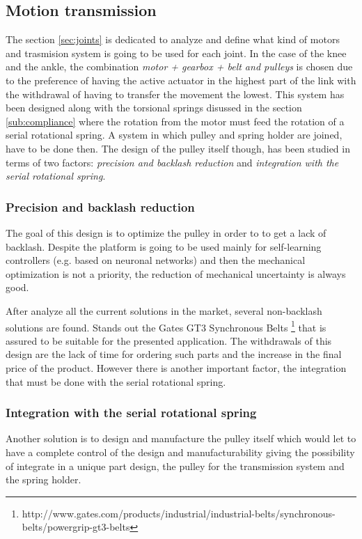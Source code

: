 \subsection{Motion transmission} %
\label{sub:pulleys_and_belts}
The section \ref{sec:joints} is dedicated to analyze and define what kind of motors and trasmision system is going to be used for each joint.
In the case of the knee and the ankle, the combination \textit{motor + gearbox + belt and pulleys} is chosen due to the preference of having the active actuator in the highest part of the link with the withdrawal of having to transfer the movement the lowest.
This system has been designed along with the torsional springs disussed in the section \ref{sub:compliance} where the rotation from the motor must feed the rotation of a serial rotational spring.
A system in which pulley and spring holder are joined, have to be done then.
The design of the pulley itself though, has been studied in terms of two factors: \textit{precision and backlash reduction} and \textit{integration with the serial rotational spring}.

\subsubsection{Precision and backlash reduction} %
\label{ssub:precision_and_backlash_reduction}
The goal of this design is to optimize the pulley in order to to get a lack of backlash.
Despite the platform is going to be used mainly for self-learning controllers (e.g. based on neuronal networks) and then the mechanical optimization is not a priority, the reduction of mechanical uncertainty is always good.

After analyze all the current solutions in the market, several non-backlash solutions are found.
Stands out the Gates GT3 Synchronous Belts \footnote{http://www.gates.com/products/industrial/industrial-belts/synchronous-belts/powergrip-gt3-belts} that is assured to be suitable for the presented application.
The withdrawals of this design are the lack of time for ordering such parts and the increase in the final price of the product. 
However there is another important factor, the integration that must be done with the serial rotational spring.

\subsubsection{Integration with the serial rotational spring} %
\label{ssub:integration_with_the_serial_rotational}
Another solution is to design and manufacture the pulley itself which would let to have a complete control of the design and manufacturability giving the possibility of integrate in a unique part design, the pulley for the transmission system and the spring holder.

